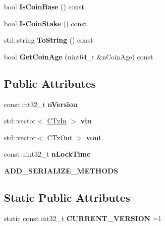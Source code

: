 \begin{DoxyCompactItemize}
bool {\bfseries Is\+Coin\+Base} () const
\item 
\mbox{\label{class_c_transaction_ace4278a41a296d40dcf5fb2b9cf007ec}} 
bool {\bfseries Is\+Coin\+Stake} () const
\item 
\mbox{\label{class_c_transaction_a80370923c3ac828de68919295d5d0659}} 
std\+::string {\bfseries To\+String} () const
\item 
\mbox{\label{class_c_transaction_a1038c65bb9818f07fefe6161af88e48f}} 
bool {\bfseries Get\+Coin\+Age} (uint64\+\_\+t \&n\+Coin\+Age) const
\end{DoxyCompactItemize}
\subsection*{Public Attributes}
\begin{DoxyCompactItemize}
\item 
\mbox{\label{class_c_transaction_abda727662de83b84dc2ef56d30690cb1}} 
const int32\+\_\+t {\bfseries n\+Version}
\item 
\mbox{\label{class_c_transaction_a53fa787e4ea57374b4fa2a28e9a957b2}} 
std\+::vector$<$ \mbox{\hyperlink{class_c_tx_in}{C\+Tx\+In}} $>$ {\bfseries vin}
\item 
\mbox{\label{class_c_transaction_ae42c0032a464c3054c508017c7d040ef}} 
std\+::vector$<$ \mbox{\hyperlink{class_c_tx_out}{C\+Tx\+Out}} $>$ {\bfseries vout}
\item 
\mbox{\label{class_c_transaction_a54d5948c11f499b28276eab6bbfdf0c5}} 
const uint32\+\_\+t {\bfseries n\+Lock\+Time}
\item 
\mbox{\label{class_c_transaction_a329b40b323445b322ab460c966669944}} 
{\bfseries A\+D\+D\+\_\+\+S\+E\+R\+I\+A\+L\+I\+Z\+E\+\_\+\+M\+E\+T\+H\+O\+DS}
\end{DoxyCompactItemize}
\subsection*{Static Public Attributes}
\begin{DoxyCompactItemize}
\item 
\mbox{\label{class_c_transaction_afcc5960eab9d35f10c6f8e6675bf2a93}} 
static const int32\+\_\+t {\bfseries C\+U\+R\+R\+E\+N\+T\+\_\+\+V\+E\+R\+S\+I\+ON} =1
\end{DoxyCompactItemize}
